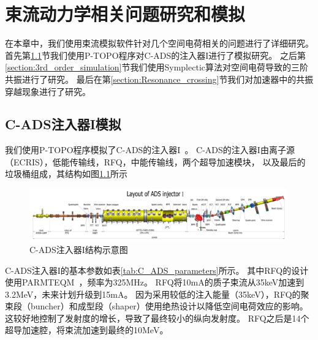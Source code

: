 \chapter{束流动力学相关问题研究和模拟} \label{chap:Simulation}
在本章中，我们使用束流模拟软件针对几个空间电荷相关的问题进行了详细研究。
首先第\ref{section:ADS_simulation}节我们使用P-TOPO程序对C-ADS的注入器I进行了模拟研究。
之后第\ref{section:3rd_order_simulation}节我们使用Symplectic算法对空间电荷导致的三阶共振进行了研究。
最后在第\ref{section:Resonance_crossing}节我们对加速器中的共振穿越现象进行了研究。

\section{C-ADS注入器I模拟}        \label{section:ADS_simulation}
我们使用P-TOPO程序模拟了C-ADS的注入器I~\cite{zhihuili2011ADS}。
C-ADS的注入器I由离子源（ECRIS），低能传输线，RFQ，中能传输线，两个超导加速模块，
以及最后的垃圾桶组成，其结构如图\ref{fig:ADS_layout}所示

\begin{figure}[!htb]
    \centering
    \includegraphics[width=0.99\textwidth]{Img/Layout_of_ADS_Injector_I.jpg}
    \caption{C-ADS注入器I结构示意图}
    \label{fig:ADS_layout}
\end{figure}

C-ADS注入器I的基本参数如表\ref{tab:C_ADS_parameters}所示。
其中RFQ的设计使用PARMTEQM~\cite{PARMTEQ_6925500,crandall1998rfq}，频率为325MHz。
RFQ将10mA的质子束流从35keV加速到3.2MeV，未来计划升级到15mA。
因为采用较低的注入能量（35keV），RFQ的聚束段（buncher）和成型段（shaper）使用绝热设计以降低空间电荷效应的影响。
这较好地控制了发射度的增长，导致了最终较小的纵向发射度。
RFQ之后是14个超导加速腔，将束流加速到最终的10MeV。

